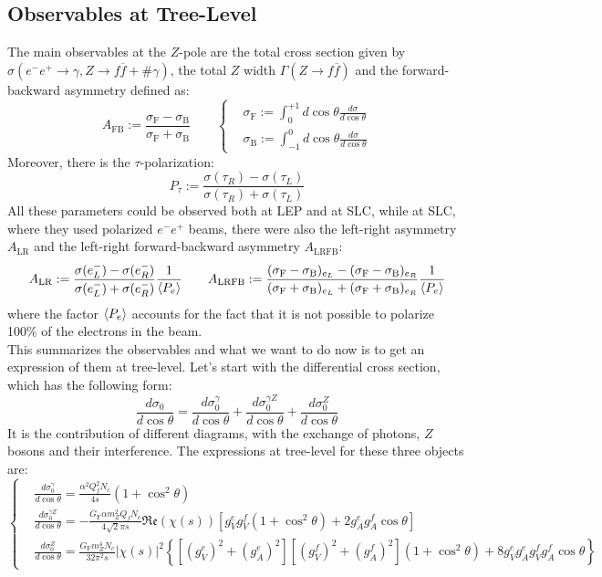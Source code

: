 \documentclass[../main.tex]{subfiles}
\begin{document}
\subsection{Observables at Tree-Level}
The main observables at the $Z$-pole are the total cross section given by $\sigma(e^-e^+\to\gamma,Z\to f\overline{f}+\#\gamma)$, the total $Z$ width $\Gamma(Z\to f\overline{f})$ and the forward-backward asymmetry defined as:
\[
A_{\text{FB}}:=\frac{\sigma_{\text{F}}-\sigma_{\text{B}}}{\sigma_{\text{F}}+\sigma_{\text{B}}} \qquad \left\{\begin{aligned}
&\sigma_{\text{F}}:=\int_0^{+1}d\cos\theta\frac{d\sigma}{d\cos\theta}\\
&\sigma_{\text{B}}:=\int_{-1}^0d\cos\theta\frac{d\sigma}{d\cos\theta}
\end{aligned}\right.
\]
Moreover, there is the $\tau$-polarization:
\[
P_\tau:=\frac{\sigma(\tau_R)-\sigma(\tau_L)}{\sigma(\tau_R)+\sigma(\tau_L)}
\]
All these parameters could be observed both at LEP and at SLC, while at SLC, where they used polarized $e^-e^+$ beams, there were also the left-right asymmetry $A_{\text{LR}}$ and the left-right forward-backward asymmetry $A_{\text{LRFB}}$:
\[
A_{\text{LR}}:=\frac{\sigma(e_L^-)-\sigma(e_R^-)}{\sigma(e_L^-)+\sigma(e_R^-)}\frac{1}{\Braket{P_e}} \qquad A_{\text{LRFB}}:=\frac{(\sigma_{\text{F}}-\sigma_{\text{B}})_{e_L}-(\sigma_{\text{F}}-\sigma_{\text{B}})_{e_R}}{(\sigma_{\text{F}}+\sigma_{\text{B}})_{e_L}+(\sigma_{\text{F}}+\sigma_{\text{B}})_{e_R}}\frac{1}{\Braket{P_e}}
\]
where the factor $\Braket{P_e}$ accounts for the fact that it is not possible to polarize 100\% of the electrons in the beam.\\
This summarizes the observables and what we want to do now is to get an expression of them at tree-level. Let's start with the differential cross section, which has the following form:
\[
\frac{d\sigma_0}{d\cos\theta}=\frac{d\sigma_0^\gamma}{d\cos\theta}+\frac{d\sigma_0^{\gamma Z}}{d\cos\theta}+\frac{d\sigma_0^Z}{d\cos\theta}
\]
It is the contribution of different diagrams, with the exchange of photons, $Z$ bosons and their interference. The expressions at tree-level for these three objects are:
\[
\left\{
\begin{aligned}
&\frac{d\sigma_0^\gamma}{d\cos\theta}=\frac{\alpha^2Q_f^2N_c}{4s}(1+\cos^2\theta)\\
&\frac{d\sigma_0^{\gamma Z}}{d\cos\theta}=-\frac{G_{\text{F}}\alpha m_Z^2Q_fN_c}{4\sqrt{2}\pi s}\mathfrak{Re}(\chi(s))\left[g_V^eg_V^f(1+\cos^2\theta)+2g_A^eg_A^f\cos\theta\right]\\
&\frac{d\sigma_0^Z}{d\cos\theta}=\frac{G_{\text{F}}m_Z^4N_c}{32\pi^2 s}|\chi(s)|^2\left\{[(g_V^e)^2+(g_A^e)^2][(g_V^f)^2+(g_A^f)^2](1+\cos^2\theta)+8g_V^eg_A^eg_V^fg_A^f\cos\theta\right\}
\end{aligned}
\right.
\]
\end{document}
